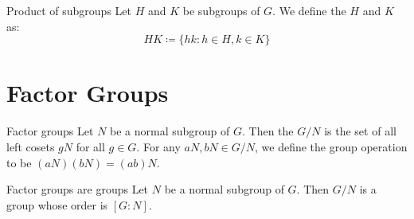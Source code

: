 \begin{dfnbox}{Product of subgroups}{}
    Let $H$ and $K$ be subgroups of $G$. We define the  $H$ and $K$ as:
    \[ HK \coloneq \{ hk : h \in H, k \in K \} \]
\end{dfnbox}

\section{Factor Groups}

\begin{dfnbox}{Factor groups}{}
    Let $N$ be a normal subgroup of $G$. Then the  $G/N$ is the set of all left cosets $gN$ for all $g \in G$. For any $aN, bN \in G/N$, we define the group operation to be $(aN)(bN) = (ab)N$.
\end{dfnbox}

\begin{thmbox}{Factor groups are groups}{}
    Let $N$ be a normal subgroup of $G$. Then $G/N$ is a group whose order is $[G : N]$.
    \tcblower
\end{thmbox}
